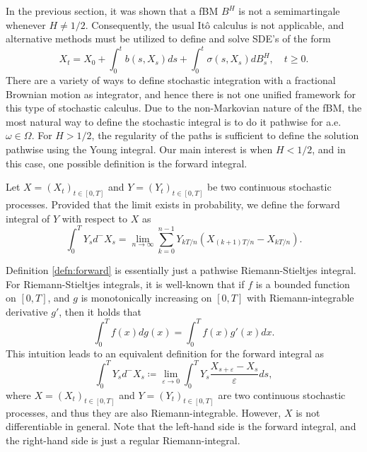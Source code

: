 In the previous section, it was shown that a fBM $B^H$ is not a semimartingale whenever $H\neq 1/2$. Consequently, the usual Itô calculus is not applicable, and alternative methods must be utilized to define and solve SDE's of the form
\begin{equation}
    X_{t}=X_{0}+\int_{0}^{t}b(s,X_{s})ds + \int_{0}^{t}\sigma(s,X_{s})dB_{s}^{H},\quad t\geq 0. 
\end{equation}
There are a variety of ways to define stochastic integration with a fractional Brownian motion as integrator, and hence there is not one unified framework for this type of stochastic calculus. Due to the non-Markovian nature of the fBM, the most natural way to define the stochastic integral is to do it pathwise for a.e. $\omega\in \Omega$. For $H>1/2$, the regularity of the paths is sufficient to define the solution pathwise using the Young integral. Our main interest is when $H<1/2$, and in this case, one possible definition is the forward integral.
\begin{defn}\label{defn:forward}
    Let $X=(X_{t})_{t\in [0,T]}$ and $Y=(Y_{t})_{t\in [0,T]}$ be two continuous stochastic processes. Provided that the limit exists in probability, we define the forward integral of $Y$ with respect to $X$ as
    \begin{equation}
        \int_{0}^{T}Y_{s}d^{-}X_{s}=\lim_{n\to\infty}\sum_{k=0}^{n-1}Y_{kT/n}(X_{(k+1)T/n}-X_{kT/n}).
    \end{equation}
\end{defn}
Definition \ref{defn:forward} is essentially just a pathwise Riemann-Stieltjes integral. For Riemann-Stieltjes integrals, it is well-known that if $f$ is a bounded function on $[0,T]$, and $g$ is monotonically increasing on $[0,T]$ with Riemann-integrable derivative $g'$, then it holds that
\begin{equation}
    \int_{0}^{T}f(x)dg(x)=\int_{0}^{T}f(x)g'(x)dx.
\end{equation}
This intuition leads to an equivalent definition for the forward integral as
\begin{equation}\label{defn:forward2}
    \int_{0}^{T}Y_{s}d^{-}X_{s}\coloneqq \lim_{\varepsilon\to 0}\int_{0}^{T}Y_{s}\frac{X_{s+\varepsilon}-X_{s}}{\varepsilon}ds,
\end{equation}
where $X=(X_{t})_{t\in [0,T]}$ and $Y=(Y_{t})_{t\in [0,T]}$ are two continuous stochastic processes, and thus they are also Riemann-integrable. However, $X$ is not differentiable in general. Note that the left-hand side is the forward integral, and the right-hand side is just a regular Riemann-integral.  

